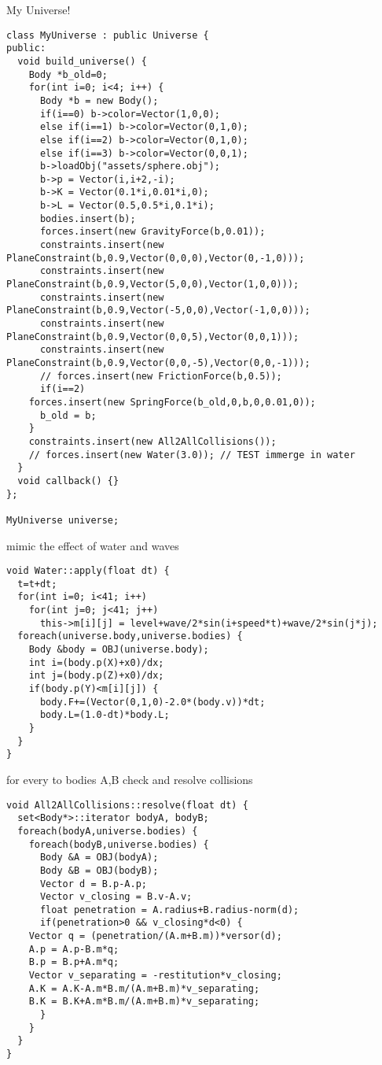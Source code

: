 My Universe!
\begin{lstlisting}
class MyUniverse : public Universe {
public:
  void build_universe() {
    Body *b_old=0;
    for(int i=0; i<4; i++) {
      Body *b = new Body();
      if(i==0) b->color=Vector(1,0,0);
      else if(i==1) b->color=Vector(0,1,0);
      else if(i==2) b->color=Vector(0,1,0);
      else if(i==3) b->color=Vector(0,0,1);
      b->loadObj("assets/sphere.obj");
      b->p = Vector(i,i+2,-i);
      b->K = Vector(0.1*i,0.01*i,0);
      b->L = Vector(0.5,0.5*i,0.1*i);
      bodies.insert(b);
      forces.insert(new GravityForce(b,0.01));
      constraints.insert(new PlaneConstraint(b,0.9,Vector(0,0,0),Vector(0,-1,0)));
      constraints.insert(new PlaneConstraint(b,0.9,Vector(5,0,0),Vector(1,0,0)));
      constraints.insert(new PlaneConstraint(b,0.9,Vector(-5,0,0),Vector(-1,0,0)));
      constraints.insert(new PlaneConstraint(b,0.9,Vector(0,0,5),Vector(0,0,1)));
      constraints.insert(new PlaneConstraint(b,0.9,Vector(0,0,-5),Vector(0,0,-1)));
      // forces.insert(new FrictionForce(b,0.5));
      if(i==2)
	forces.insert(new SpringForce(b_old,0,b,0,0.01,0));
      b_old = b;
    }
    constraints.insert(new All2AllCollisions());
    // forces.insert(new Water(3.0)); // TEST immerge in water
  }
  void callback() {}
};

MyUniverse universe;
\end{lstlisting}

mimic the effect of water and waves
\begin{lstlisting}
void Water::apply(float dt) {
  t=t+dt;
  for(int i=0; i<41; i++)
    for(int j=0; j<41; j++)
      this->m[i][j] = level+wave/2*sin(i+speed*t)+wave/2*sin(j*j);
  foreach(universe.body,universe.bodies) {
    Body &body = OBJ(universe.body);
    int i=(body.p(X)+x0)/dx;
    int j=(body.p(Z)+x0)/dx;
    if(body.p(Y)<m[i][j]) {
      body.F+=(Vector(0,1,0)-2.0*(body.v))*dt;    
      body.L=(1.0-dt)*body.L;
    }
  }
}
\end{lstlisting}

for every to bodies A,B check and resolve collisions
\begin{lstlisting}
void All2AllCollisions::resolve(float dt) {
  set<Body*>::iterator bodyA, bodyB;
  foreach(bodyA,universe.bodies) {
    foreach(bodyB,universe.bodies) {
      Body &A = OBJ(bodyA);
      Body &B = OBJ(bodyB);
      Vector d = B.p-A.p;
      Vector v_closing = B.v-A.v;
      float penetration = A.radius+B.radius-norm(d);	  
      if(penetration>0 && v_closing*d<0) {
	Vector q = (penetration/(A.m+B.m))*versor(d);
	A.p = A.p-B.m*q;
	B.p = B.p+A.m*q;
	Vector v_separating = -restitution*v_closing;
	A.K = A.K-A.m*B.m/(A.m+B.m)*v_separating;
	B.K = B.K+A.m*B.m/(A.m+B.m)*v_separating;	
      }
    } 
  }
}
\end{lstlisting}

